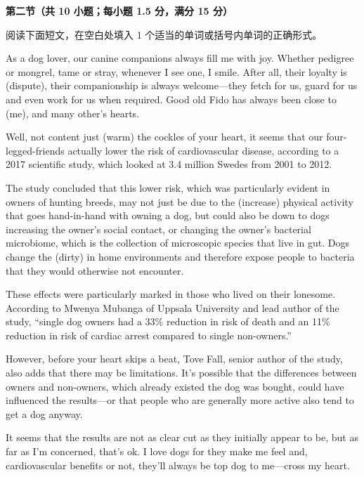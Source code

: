 \documentclass{exam-zh}
\begin{document}
\begin{flushleft}
  {\bfseries 第二节（共 10 小题；每小题 1.5 分，满分 15 分）}
\end{flushleft}

阅读下面短文，在空白处填入 1 个适当的单词或括号内单词的正确形式。

As a dog lover, our canine companions always fill me with joy. Whether pedigree or mongrel, tame or stray, whenever I see one, I smile. After all, their loyalty is \fillin[indisputable] (dispute), their companionship is always welcome—they fetch for us, guard for us and even work for us when required. Good old Fido has always been close to \fillin[mine 或 my] (me), and many other's hearts.

Well, not content \fillin[with] just \fillin[warming] (warm) the cockles of your heart, it seems that our four-legged-friends actually lower the risk of cardiovascular disease, according to a 2017 scientific study, which looked at 3.4 million Swedes from 2001 to 2012.

The study concluded that this lower risk, which was particularly evident in owners of hunting breeds, may not just be due to the \fillin[increasing] (increase) physical activity that goes hand-in-hand with owning a dog, but could also be down to dogs increasing the owner's social contact, or \fillin[by] changing the owner's bacterial microbiome, which is the collection of microscopic species that live in \fillin[their] gut. Dogs change the \fillin[dirt] (dirty) in home environments and therefore expose people to bacteria that they would otherwise not encounter.

These effects were particularly marked in those who lived on their lonesome. According to Mwenya Mubanga of Uppsala University and lead author of the study, ``single dog owners had a 33\% reduction in risk of death and an 11\% reduction in risk of cardiac arrest compared to single non-owners.''

However, before your heart skips a beat, Tove Fall, senior author of the study, also adds that there may be limitations. It's possible that the differences between owners and non-owners, which already existed \fillin[before] the dog was bought, could have influenced the results—or that people who are generally more active also tend to get a dog anyway.

It seems that the results are not as clear cut as they initially appear to be, but as far as I'm concerned, that's ok. I love dogs for \fillin[whether] they make me feel and, cardiovascular benefits or not, they'll always be top dog to me—cross my heart.
\end{document}
